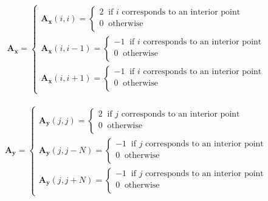 \documentclass[12 pt, final]{article}
\begin{document}
\begin{itemize}
\begin{itemize}
            \begin{align*}
                    \mathbf{A_x} = \begin{cases}
                    \mathbf{A_x}(i,i) =
                    \begin{cases}
                    2 \: \text{ if $i$ corresponds to an interior point}\:\\
                    0 \: \text{ otherwise}\:\\
                    \end{cases}\\
                    \mathbf{A_x}(i,i-1) =
                    \begin{cases}
                    -1 \: \text{ if $i$ corresponds to an interior point}\:\\
                    0 \: \text{ otherwise}\:\\
                    \end{cases}\\
                    \mathbf{A_x}(i,i+1) =
                    \begin{cases}
                    -1 \: \text{ if $i$ corresponds to an interior point}\:\\
                    0 \: \text{ otherwise}\:\\
                    \end{cases}
                    \end{cases}
            \end{align*}

   
            
            \begin{align*}
                    \mathbf{A_y} = \begin{cases}
                    \mathbf{A_y}(j,j) =
                    \begin{cases}
                    2 \: \text{ if $j$ corresponds to an interior point}\:\\
                    0 \: \text{ otherwise}\:\\
                    \end{cases}\\
                    \mathbf{A_y}(j,j-N) =
                    \begin{cases}
                    -1 \: \text{ if $j$ corresponds to an interior point}\:\\
                    0 \: \text{ otherwise}\:\\
                    \end{cases}\\
                    \mathbf{A_y}(j,j+N) =
                    \begin{cases}
                    -1 \: \text{ if $j$ corresponds to an interior point}\:\\
                    0 \: \text{ otherwise}\:\\
                    \end{cases}
                    \end{cases}
            \end{align*}


\end{itemize}
\end{itemize}
\end{document}
